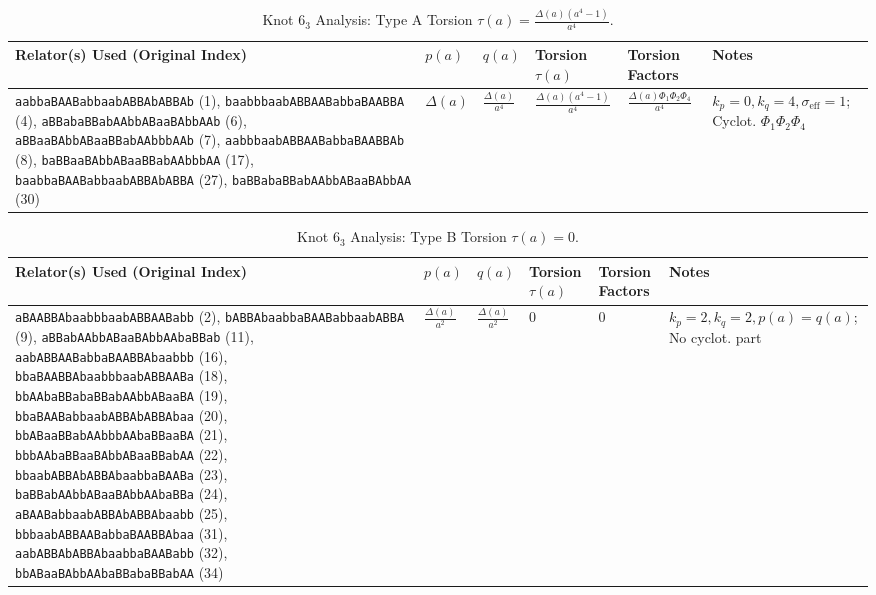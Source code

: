 \documentclass{article}
\begin{document}
\begin{table}[htbp]
\centering
\caption{Knot $6_3$ Analysis: Type A Torsion $\tau(a) = \frac{\Delta(a)(a^4-1)}{a^4}$.}
\label{tab:knot63_type_A}
\scriptsize
\begin{tabular}{@{}p{4.0cm} p{1.8cm} p{1.8cm} p{2.2cm} p{3.0cm} p{3.2cm}@{}}
\toprule
\textbf{Relator(s) Used (Original Index)} & \textbf{$p(a)$} & \textbf{$q(a)$} & \textbf{Torsion $\tau(a)$} & \textbf{Torsion Factors} & \textbf{Notes} \\
\midrule
\texttt{aabbaBAABabbaabABBAbABBAb} (1), \texttt{baabbbaabABBAABabbaBAABBA} (4), \texttt{aBBabaBBabAAbbABaaBAbbAAb} (6), \texttt{aBBaaBAbbABaaBBabAAbbbAAb} (7), \texttt{aabbbaabABBAABabbaBAABBAb} (8), \texttt{baBBaaBAbbABaaBBabAAbbbAA} (17), \texttt{baabbaBAABabbaabABBAbABBA} (27), \texttt{baBBabaBBabAAbbABaaBAbbAA} (30)
& $\Delta(a)$ & $\frac{\Delta(a)}{a^4}$ & $\frac{\Delta(a)(a^4-1)}{a^4}$ & $\frac{\Delta(a)\Phi_1\Phi_2\Phi_4}{a^4}$ & $k_p=0, k_q=4, \sigma_{\text{eff}}=1$; Cyclot. $\Phi_1\Phi_2\Phi_4$ \\
\bottomrule
\end{tabular}
\end{table}

\begin{table}[htbp]
\centering
\caption{Knot $6_3$ Analysis: Type B Torsion $\tau(a) = 0$.}
\label{tab:knot63_type_B}
\scriptsize
\begin{tabular}{@{}p{4.0cm} p{1.8cm} p{1.8cm} p{2.2cm} p{3.0cm} p{3.2cm}@{}}
\toprule
\textbf{Relator(s) Used (Original Index)} & \textbf{$p(a)$} & \textbf{$q(a)$} & \textbf{Torsion $\tau(a)$} & \textbf{Torsion Factors} & \textbf{Notes} \\
\midrule
\texttt{aBAABBAbaabbbaabABBAABabb} (2), \texttt{bABBAbaabbaBAABabbaabABBA} (9), \texttt{aBBabAAbbABaaBAbbAAbaBBab} (11), \texttt{aabABBAABabbaBAABBAbaabbb} (16), \texttt{bbaBAABBAbaabbbaabABBAABa} (18), \texttt{bbAAbaBBabaBBabAAbbABaaBA} (19), \texttt{bbaBAABabbaabABBAbABBAbaa} (20), \texttt{bbABaaBBabAAbbbAAbaBBaaBA} (21), \texttt{bbbAAbaBBaaBAbbABaaBBabAA} (22), \texttt{bbaabABBAbABBAbaabbaBAABa} (23), \texttt{baBBabAAbbABaaBAbbAAbaBBa} (24), \texttt{aBAABabbaabABBAbABBAbaabb} (25), \texttt{bbbaabABBAABabbaBAABBAbaa} (31), \texttt{aabABBAbABBAbaabbaBAABabb} (32), \texttt{bbABaaBAbbAAbaBBabaBBabAA} (34)
& $\frac{\Delta(a)}{a^2}$ & $\frac{\Delta(a)}{a^2}$ & $0$ & $0$ & $k_p=2, k_q=2, p(a)=q(a)$; No cyclot. part \\
\bottomrule
\end{tabular}
\end{table}
\end{document}
